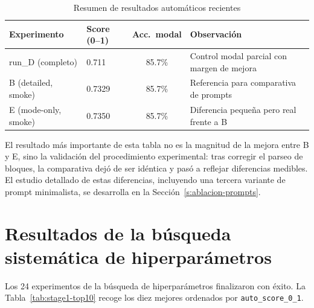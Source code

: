 \documentclass[%
    school=etsisi,%
    type=pfg,%
    degree=61CD,%
]{upm-report}
\begin{document}
\begin{table}[htbp]
    \centering
    \caption{Resumen de resultados autom\'aticos recientes}
    \label{tab:resultados-recientes}
    \begin{tabular}{llcp{4cm}}
        \toprule
        \textbf{Experimento} & \textbf{Score (0--1)} & \textbf{Acc.\ modal} & \textbf{Observaci\'on} \\
        \midrule
        run\_D (completo)    & 0.711 & 85.7\% & Control modal parcial con margen de mejora \\
        B (detailed, smoke)  & 0.7329 & 85.7\% & Referencia para comparativa de prompts \\
        E (mode-only, smoke) & 0.7350 & 85.7\% & Diferencia peque\~na pero real frente a B \\
        \bottomrule
    \end{tabular}
\end{table}

El resultado m\'as importante de esta tabla no es la magnitud de la mejora entre B y E, sino la validaci\'on del procedimiento experimental: tras corregir el parseo de bloques, la comparativa dej\'o de ser id\'entica y pas\'o a reflejar diferencias medibles. El estudio detallado de estas diferencias, incluyendo una tercera variante de prompt minimalista, se desarrolla en la Secci\'on~\ref{s:ablacion-prompts}.

\section{Resultados de la b\'usqueda sistem\'atica de hiperpar\'ametros}
\label{s:stage1-resultados}

Los 24 experimentos de la b\'usqueda de hiperpar\'ametros finalizaron con \'exito. La Tabla~\ref{tab:stage1-top10} recoge los diez mejores ordenados por \texttt{auto\_score\_0\_1}.
\end{document}
